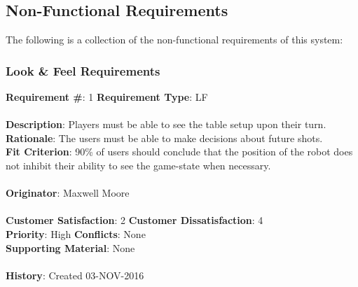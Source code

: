 \documentclass[titlepage]{article}
\begin{document}
\subsection{Non-Functional Requirements}
The following is a collection of the non-functional requirements of this system:
\subsubsection{Look \& Feel Requirements}
\begin{framed}
	\noindent\textbf{Requirement \#}: 1 \hfill \textbf{Requirement Type}: LF \hfill\\\\
	\noindent\textbf{Description}: Players must be able to see the table setup upon their turn.\\
	\textbf{Rationale}: The users must be able to make decisions about future shots.\\
	\textbf{Fit Criterion}: 90\% of users should conclude that the position of the robot does not inhibit their ability to see the game-state when necessary.\\\\
	\textbf{Originator}: Maxwell Moore\\\\
	\noindent\textbf{Customer Satisfaction}: 2 \hfill 	\textbf{Customer Dissatisfaction}: 4 \hfill\\
	\textbf{Priority}: High \hfill \textbf{Conflicts}: None \hfill\\
	\textbf{Supporting Material}: None\\\\
	\noindent\textbf{History}: Created 03-NOV-2016
\end{framed}
\end{document}

